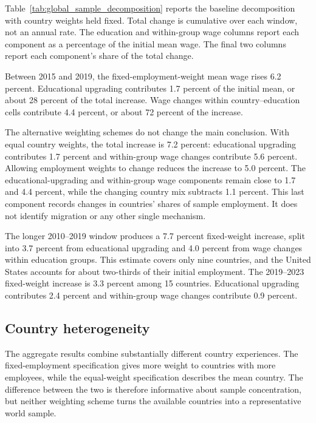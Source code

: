\documentclass[11pt]{article}
\begin{document}
Table~\ref{tab:global_sample_decomposition} reports the baseline decomposition
with country weights held fixed. Total change is cumulative over each window,
not an annual rate. The education and within-group wage columns report each
component as a percentage of the initial mean wage. The final two columns
report each component's share of the total change.



Between 2015 and 2019, the fixed-employment-weight mean wage rises 6.2
percent. Educational upgrading contributes 1.7 percent of the initial mean,
or about 28 percent of the total increase. Wage changes within
country--education cells contribute 4.4 percent, or about 72 percent of the
increase.

The alternative weighting schemes do not change the main conclusion. With
equal country weights, the total increase is 7.2 percent: educational
upgrading contributes 1.7 percent and within-group wage changes contribute 5.6
percent. Allowing employment weights to change reduces the increase to 5.0
percent. The educational-upgrading and within-group wage components remain
close to 1.7 and 4.4 percent, while the changing country mix subtracts 1.1
percent. This last component records changes in countries' shares of sample
employment. It does not identify migration or any other single mechanism.

The longer 2010--2019 window produces a 7.7 percent fixed-weight increase,
split into 3.7 percent from educational upgrading and 4.0 percent from wage
changes within education groups. This estimate covers only nine countries,
and the United States accounts for about two-thirds of their initial
employment. The 2019--2023 fixed-weight increase is 3.3 percent among 15
countries. Educational upgrading contributes 2.4 percent and within-group
wage changes contribute 0.9 percent.

\subsection{Country heterogeneity}

The aggregate results combine substantially different country experiences.
The fixed-employment specification gives more weight to countries with more
employees, while the equal-weight specification describes the mean country.
The difference between the two is therefore informative about sample
concentration, but neither weighting scheme turns the available countries into
a representative world sample.
\end{document}
